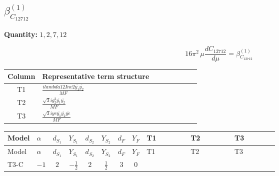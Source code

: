 \documentclass[8pt]{article}
\begin{document}
\begin{landscape}
\section*{$\beta_{C_{12712}}^{(1)}$}
\noindent\textbf{Quantity: }$\mathrm{1,2,7,12}$\par\smallskip
\[16\pi^2\,\mu\frac{d C_{12712}}{d\mu}=\beta_{C_{12712}}^{(1)}\]
\begin{center}
\begin{tabular}{@{}c >{\raggedright\arraybackslash}p{0.82\linewidth}@{}}
\toprule
Column & Representative term structure \\
\midrule
T1 & \(\displaystyle \frac{i lambda12Inv2 \overline{y_{1}} \overline{y_{2}}}{MF}\) \\
\midrule
T2 & \(\displaystyle \frac{\sqrt{3} i g_{2}^{2} \overline{y_{1}} \overline{y_{2}}}{MF}\) \\
\midrule
T3 & \(\displaystyle \frac{\sqrt{3} i ye \overline{y_{1}} \overline{y_{2}} \overline{ye}}{MF}\) \\
\midrule
\bottomrule
\end{tabular}
\end{center}
\smallskip
\tiny
\begin{longtable}{@{}llcccccc >{\raggedright\arraybackslash}p{0.21\linewidth} >{\raggedright\arraybackslash}p{0.21\linewidth} >{\raggedright\arraybackslash}p{0.21\linewidth}@{}}
\toprule
Model & $\alpha$ & $d_{S_1}$ & $Y_{S_1}$ & $d_{S_2}$ & $Y_{S_2}$ & $d_F$ & $Y_F$ & T1 & T2 & T3 \\
\midrule
\endfirsthead
\toprule
Model & $\alpha$ & $d_{S_1}$ & $Y_{S_1}$ & $d_{S_2}$ & $Y_{S_2}$ & $d_F$ & $Y_F$ & T1 & T2 & T3 \\
\midrule
\endhead
T3-C & $-1$ & $2$ & $-\frac{1}{2}$ & $2$ & $\frac{1}{2}$ & $3$ & $0$ & \scriptsize\adjustbox{max width=\linewidth}{$\begin{gathered} \frac{i lambda12Inv2 \overline{y_{1}} \overline{y_{2}}}{6 MF}\end{gathered}$} & \scriptsize\adjustbox{max width=\linewidth}{$\begin{gathered} \frac{\sqrt{3} i g_{2}^{2} \overline{y_{1}} \overline{y_{2}}}{8 MF}\end{gathered}$} & \scriptsize\adjustbox{max width=\linewidth}{$\begin{gathered} - \frac{\sqrt{3} i ye \overline{y_{1}} \overline{y_{2}} \overline{ye}}{24 MF}\end{gathered}$} \\
\midrule
\bottomrule
\end{longtable}
\clearpage

\end{landscape}
\end{document}
